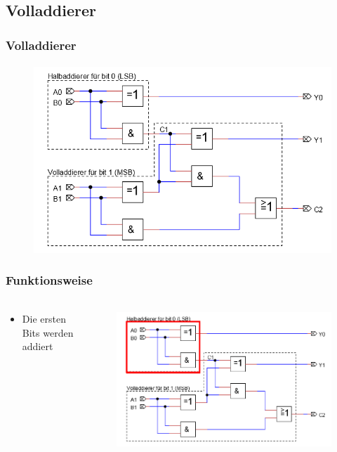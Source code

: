 \subsection{Volladdierer} %
\label{sub:Volladdierer}
\begin{frame}
    \frametitle{Volladdierer}
    \framesubtitle{}
    \begin{figure}[H]
    \begin{center}
            \includegraphics[scale=0.5]{./img/schaltung/Volladdierer.PNG}
    \end{center}
    \end{figure}
\end{frame}
\begin{frame}
    \frametitle{Funktionsweise}
    \framesubtitle{}
     \begin{columns}[c]
            \begin{block}{}
                \begin{itemize}
                    \item Die ersten Bits werden addiert
                \end{itemize}
            \end{block}
            \begin{figure}[H]
            \begin{center}
                    \includegraphics[scale=0.4]{./img/schaltung/Volladdierer_fun_1.png}
            \end{center}
            \end{figure}
     \end{columns}
\end{frame}
